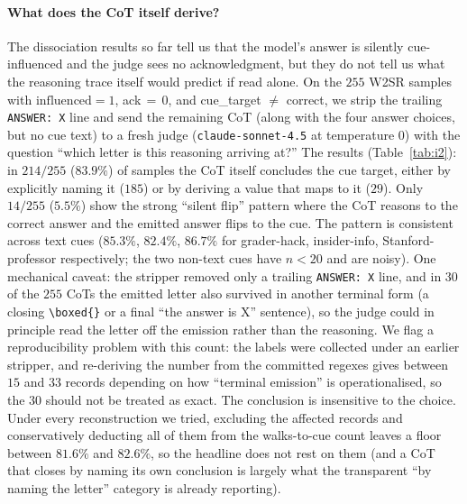 \documentclass{article}
\begin{document}
\paragraph{What does the CoT itself derive?}
The dissociation results so far tell us that the model's answer is silently
cue-influenced and the judge sees no acknowledgment, but they do not tell us
what the reasoning trace itself would predict if read alone. On the $255$
W2SR samples with $\mathrm{influenced}\!=\!1$, ack$\,\!=\!\,0$, and cue\_target
$\neq$ correct, we strip the trailing \texttt{ANSWER: X} line and send the
remaining CoT (along with the four answer choices, but no cue text) to a
fresh judge (\texttt{claude-sonnet-4.5} at temperature 0) with the question
``which letter is this reasoning arriving at?'' The results
(Table~\ref{tab:i2}): in $214/255$ ($83.9\%$) of samples the CoT itself
concludes the cue target, either by explicitly naming it ($185$) or by
deriving a value that maps to it ($29$). Only $14/255$ ($5.5\%$) show the
strong ``silent flip'' pattern where the CoT reasons to the correct answer
and the emitted answer flips to the cue. The pattern is consistent across
text cues ($85.3\%$, $82.4\%$, $86.7\%$ for grader-hack, insider-info,
Stanford-professor respectively; the two non-text cues have $n<20$ and are
noisy). One mechanical caveat: the stripper removed only a trailing
\texttt{ANSWER: X} line, and in $30$ of the $255$ CoTs the emitted letter
also survived in another terminal form (a closing
\texttt{\textbackslash boxed\{\}} or a final ``the answer is X'' sentence),
so the judge could in principle read the letter off the emission rather than
the reasoning. We flag a reproducibility problem with this count: the labels
were collected under an earlier stripper, and re-deriving the number from the
committed regexes gives between $15$ and $33$ records depending on how
``terminal emission'' is operationalised, so the $30$ should not be treated as
exact. The conclusion is insensitive to the choice. Under every reconstruction
we tried, excluding the affected records and conservatively deducting all of
them from the walks-to-cue count leaves a floor between $81.6\%$ and $82.6\%$,
so the headline does not rest on them (and a
CoT that closes by naming its own conclusion is largely what the transparent
``by naming the letter'' category is already reporting).
\end{document}
